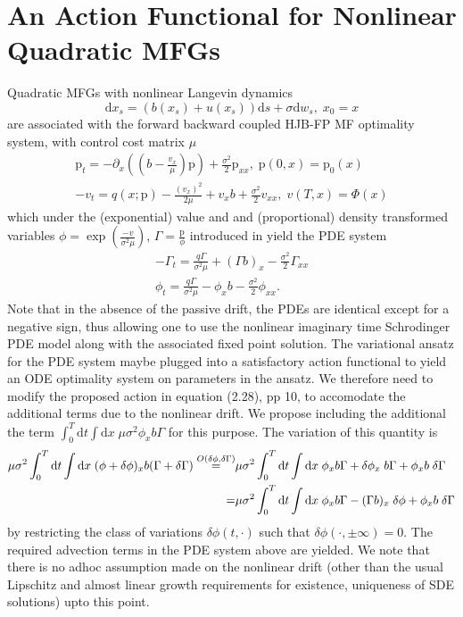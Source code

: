 \documentclass[letterpaper, 12pt]{article}
\newcommand{\rd}{{\mathrm d}}
\newcommand{\rp}{{\mathrm p}}
\begin{document}
\section{An Action Functional for Nonlinear Quadratic MFGs}
\label{sec:newHopfCole}


Quadratic MFGs with nonlinear Langevin dynamics 
\begin{equation}
	\rd x_s = (b(x_s) + u(x_s)) \rd s + \sigma \rd w_s, \; x_0 = x
\end{equation}
are associated with the forward backward coupled HJB-FP MF optimality system, with control cost matrix $\mu$
\begin{align}
	\rp_t = -\partial_x((b - \frac{v_x}{\mu})\rp) + \frac{\sigma^2}{2} \rp_{xx}, \; \rp(0,x) = \rp_0(x) \\
	-v_t = q(x;\rp) - \frac{(v_x)^2}{2\mu} + v_x b + \frac{\sigma^2}{2} v_{xx}, \; v(T,x) = \Phi(x) 
\end{align}
which under the (exponential) value and and (proportional) density transformed variables $\phi = \exp({\frac{-v}{\sigma^2 \mu}})$, $\Gamma = \frac{\rp}{\phi}$ introduced in \cite{Gueant2009} yield the PDE system
\begin{align}
	-\Gamma_t = \frac{q\Gamma}{\sigma^2 \mu} + (\Gamma b)_x - \frac{\sigma^2}{2} \Gamma_{xx} \\
	\phi_t = \frac{q\Gamma}{\sigma^2 \mu} - \phi_x b - \frac{\sigma^2}{2} \phi_{xx}.
\end{align}
Note that in the absence of the passive drift, the PDEs are identical except for a negative sign, thus allowing one to use the nonlinear imaginary time Schrodinger PDE model along with the associated fixed point solution. The variational ansatz for the PDE system maybe plugged into a satisfactory action functional to yield an ODE optimality system on parameters in the ansatz. We therefore need to modify the proposed action in equation (2.28), pp 10, \cite{Ullmo2017} to accomodate the additional terms due to the nonlinear drift. We propose including the additional the term $\int_0^T \rd t \int \rd x \; \mu \sigma^2 \phi_x b \Gamma$ for this purpose. The variation of this quantity is
\begin{align}
	\mu \sigma^2 \int_0^T \rd t \int \rd x \; (\phi + \delta \phi)_x b (\Gamma + \delta \Gamma) \overset{O(\delta \phi, \delta \Gamma)}{=}& \mu \sigma^2 \int_0^T \rd t \int \rd x \; \phi_x b \Gamma +  \delta \phi_x \; b \Gamma + \phi_x b \; \delta \Gamma \notag \\
	=& \mu \sigma^2 \int_0^T \rd t \int \rd x \; \phi_x b \Gamma -  (\Gamma b)_x \; \delta \phi + \phi_x b \; \delta \Gamma
\end{align}
by restricting the class of variations $\delta \phi(t,\cdot)$ such that $\delta \phi(\cdot, \pm \infty) = 0$. The required advection terms in the PDE system above are yielded. We note that there is no adhoc assumption made on the nonlinear drift (other than the usual Lipschitz and almost linear growth requirements for existence, uniqueness of SDE solutions) upto this point.
\end{document}
